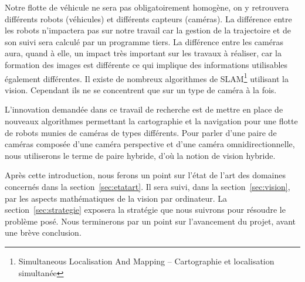 
Notre flotte de véhicule ne sera pas obligatoirement homogène, on y retrouvera différents robots (véhicules) et différents capteurs (caméras).
La différence entre les robots n'impactera pas sur notre travail car la gestion de la trajectoire et de son suivi sera calculé par un programme tiers.
La différence entre les caméras aura, quand à elle, un impact très important sur les travaux à réaliser, car la formation des images est différente ce qui implique des informations utilisables également différentes.
Il existe de nombreux algorithmes de SLAM\footnote{Simultaneous Localisation And Mapping -- Cartographie et localisation simultanée} utilisant la vision.
Cependant ils ne se concentrent que sur un type de caméra à la fois.

L'innovation demandée dans ce travail de recherche est de mettre en place de nouveaux algorithmes permettant la cartographie et la navigation pour une flotte de robots munies de caméras de types différents.
Pour parler d'une paire de caméras composée d'une caméra perspective et d'une caméra omnidirectionnelle, nous utiliserons le terme de paire hybride, d'où la notion de vision hybride.

\vspace{5mm}
Après cette introduction, nous ferons un point sur l'état de l'art des domaines concernés dans la section~\ref{sec:etatart}.
Il sera suivi, dans la section~\ref{sec:vision}, par les aspects mathématiques de la vision par ordinateur.
La section~\ref{sec:strategie} exposera la stratégie que nous suivrons pour résoudre le problème posé.
Nous terminerons par un point sur l'avancement du projet, avant une brève conclusion.
